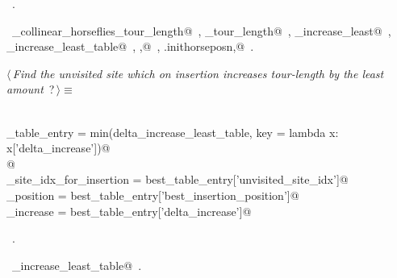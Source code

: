\documentclass[11.5pt]{report}
\begin{document}
\begin{flushleft}
\begin{list}{}{}
\mbox{}\verb@                                   'best_insertion_position' : ibest, \@\\
\mbox{}\verb@                                   'delta_increase'          : delta_increase_least})@\\
\mbox{}\verb@@{\NWsep}
\end{list}
\vspace{-1.5ex}
\footnotesize
\begin{list}{}{\setlength{\itemsep}{-\parsep}\setlength{\itemindent}{-\leftmargin}}
\item \NWtxtMacroRefIn\ .
\item \NWtxtIdentsUsed\nobreak\  \verb@compute_collinear_horseflies_tour_length@\nobreak\ , \verb@current_tour_length@\nobreak\ , \verb@delta_increase_least@\nobreak\ , \verb@delta_increase_least_table@\nobreak\ , \verb@ibest,@\nobreak\ , \verb@self.inithorseposn,@\nobreak\ .
\item{}
\end{list}
\vspace{4ex}
\end{flushleft}
\newchunk 
\begin{flushleft} \small\label{scrap39}\raggedright\small
{} $\langle\,${\itshape Find the unvisited site which on insertion increases tour-length by the least amount}\nobreak\ {\footnotesize {?}}$\,\rangle\equiv$
\vspace{-1ex}
\begin{list}{}{} \item
\mbox{}\verb@@\\
\mbox{}\verb@best_table_entry = min(delta_increase_least_table, key = lambda x: x['delta_increase'])@\\
\mbox{}\verb@         @\\
\mbox{}\verb@unvisited_site_idx_for_insertion = best_table_entry['unvisited_site_idx']@\\
\mbox{}\verb@insertion_position               = best_table_entry['best_insertion_position']@\\
\mbox{}\verb@delta_increase                   = best_table_entry['delta_increase']@\\
\mbox{}\verb@@{\NWsep}
\end{list}
\vspace{-1.5ex}
\footnotesize
\begin{list}{}{\setlength{\itemsep}{-\parsep}\setlength{\itemindent}{-\leftmargin}}
\item \NWtxtMacroRefIn\ .
\item \NWtxtIdentsUsed\nobreak\  \verb@delta_increase_least_table@\nobreak\ .
\item{}
\end{list}
\vspace{4ex}
\end{flushleft}
\end{document}
